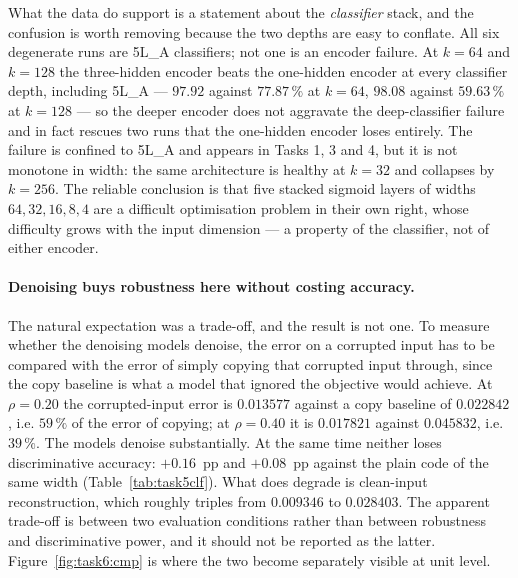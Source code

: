 \documentclass[11pt,a4paper]{article}
\begin{document}
What the data do support is a statement about the \emph{classifier} stack, and the confusion is
worth removing because the two depths are easy to conflate.  All six degenerate runs are 5L\_A
classifiers; not one is an encoder failure.  At $k=64$ and $k=128$ the three-hidden encoder beats
the one-hidden encoder at every classifier depth, including 5L\_A --- $97.92$ against $77.87\,\%$
at $k=64$, $98.08$ against $59.63\,\%$ at $k=128$ --- so the deeper encoder does not aggravate the
deep-classifier failure and in fact rescues two runs that the one-hidden encoder loses entirely.
The failure is confined to 5L\_A and appears in Tasks 1, 3 and 4, but it is not monotone in width:
the same architecture is healthy at $k=32$ and collapses by $k=256$.  The reliable conclusion is
that five stacked sigmoid layers of widths $64,32,16,8,4$ are a difficult optimisation problem in
their own right, whose difficulty grows with the input dimension --- a property of the classifier,
not of either encoder.

\paragraph{Denoising buys robustness here without costing accuracy.}
The natural expectation was a trade-off, and the result is not one.  To measure whether the
denoising models denoise, the error on a corrupted input has to be compared with the error of
simply copying that corrupted input through, since the copy baseline is what a model that ignored
the objective would achieve.  At $\rho=0.20$ the corrupted-input error is $0.013577$ against a
copy baseline of $0.022842$, i.e. $59\,\%$ of the error of copying; at $\rho=0.40$ it is
$0.017821$ against $0.045832$, i.e. $39\,\%$.  The models denoise substantially.  At the same time
neither loses discriminative accuracy: $+0.16$~pp and $+0.08$~pp against the plain code of the same
width (Table~\ref{tab:task5clf}).  What does degrade is clean-input reconstruction, which roughly
triples from $0.009346$ to $0.028403$.  The apparent trade-off is between two evaluation
conditions rather than between robustness and discriminative power, and it should not be reported
as the latter.  Figure~\ref{fig:task6:cmp} is where the two become separately visible at unit
level.
\end{document}
